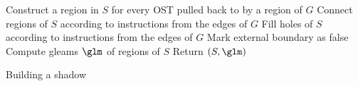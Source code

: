 \begin{algorithm}
  \label{alg:a2over}

      Construct a region in $S$ for every OST pulled back to by a region of $G$\;
      Connect regions of $S$ according to instructions from the edges of $G$\;
      Fill holes of $S$ according to instructions from the edges of $G$\;
      Mark external boundary as false\;
      Compute gleams $\glm$ of regions of $S$\;
      Return $(S,\glm)$\;
    \caption{Building a shadow}
\end{algorithm}
